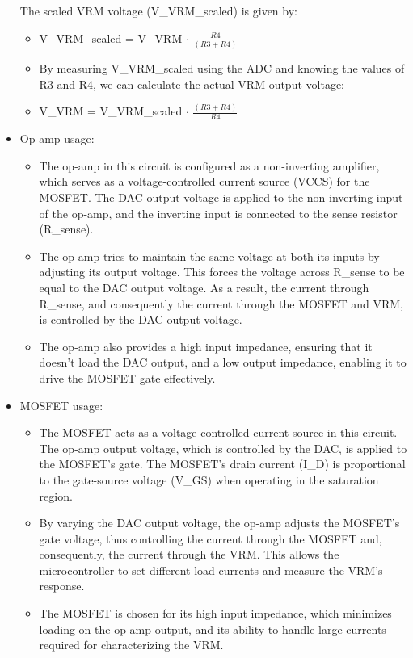 \documentclass[a4paper,11pt]{article}%
\begin{document}
\begin{itemize}
  The scaled VRM voltage (V\_VRM\_scaled) is given by:
  \begin{itemize}
    \item V\_VRM\_scaled = V\_VRM $\cdot$ $\frac{R4}{(R3 + R4)}$
    \item By measuring V\_VRM\_scaled using the ADC and knowing the values of R3 and R4, we can calculate the actual VRM output voltage:
    \item V\_VRM = V\_VRM\_scaled $\cdot$ $\frac{(R3 + R4)}{R4}$
  \end{itemize}
  \item Op-amp usage:\\
  \begin{itemize}
    \item The op-amp in this circuit is configured as a non-inverting amplifier, which serves as a voltage-controlled current source (VCCS) for the MOSFET. The DAC output voltage is applied to the non-inverting input of the op-amp, and the inverting input is connected to the sense resistor (R\_sense).
  
    \item The op-amp tries to maintain the same voltage at both its inputs by adjusting its output voltage. This forces the voltage across R\_sense to be equal to the DAC output voltage. As a result, the current through R\_sense, and consequently the current through the MOSFET and VRM, is controlled by the DAC output voltage.
    
    \item The op-amp also provides a high input impedance, ensuring that it doesn't load the DAC output, and a low output impedance, enabling it to drive the MOSFET gate effectively.
  \end{itemize}
  \item MOSFET usage:\\
  \begin{itemize}
    \item The MOSFET acts as a voltage-controlled current source in this circuit. The op-amp output voltage, which is controlled by the DAC, is applied to the MOSFET's gate. The MOSFET's drain current (I\_D) is proportional to the gate-source voltage (V\_GS) when operating in the saturation region.
  
    \item By varying the DAC output voltage, the op-amp adjusts the MOSFET's gate voltage, thus controlling the current through the MOSFET and, consequently, the current through the VRM. This allows the microcontroller to set different load currents and measure the VRM's response.
    
    \item The MOSFET is chosen for its high input impedance, which minimizes loading on the op-amp output, and its ability to handle large currents required for characterizing the VRM.
  \end{itemize}
\end{itemize}
\end{document}
